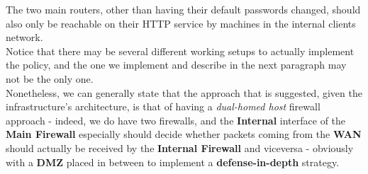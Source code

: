 The two main routers, other than having their default passwords changed, should also only be reachable on their HTTP service by machines in the internal clients network.\\
Notice that there may be several different working setups to actually implement the policy, and the one we implement and describe in the next paragraph may not be the only one.\\
Nonetheless, we can generally state that the approach that is suggested, given the infrastructure's architecture, is that of having a \textit{dual-homed host} firewall approach - indeed, we do have two firewalls, and the \textbf{Internal} interface of the \textbf{Main Firewall} especially should decide whether packets coming from the \textbf{WAN} should actually be received by the \textbf{Internal Firewall} and viceversa - obviously with a \textbf{DMZ} placed in between to implement a \textbf{defense-in-depth} strategy.
